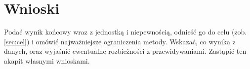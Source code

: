 \section{Wnioski}
\label{sec:wnioski}
Podać wynik końcowy wraz z jednostką i niepewnością, odnieść go do celu
(zob. \cref{sec:cel}) i omówić najważniejsze ograniczenia metody.
Wskazać, co wynika z danych, oraz wyjaśnić ewentualne rozbieżności
z przewidywaniami. Zastąpić ten akapit własnymi wnioskami.
